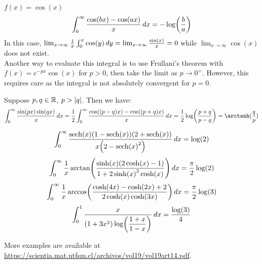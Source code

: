 \documentclass[main.tex]{subfiles}
\begin{document}
\begin{example}
    $f(x)=\cos(x)$
    \begin{equation*}
        \int_0^\infty \frac{\cos(bx)-\cos(ax)}{x}\,dx = -\log(\frac{b}{a})
    \end{equation*}
    In this case, $\lim_{x\to\infty} \frac{1}{x}\int_0^x \cos(y)\,dy=\lim_{x\to\infty} \frac{\sin(x)}{x}=0$ while $\lim_{x\to\infty} \cos(x)$ does not exist.\\
    
    Another way to evaluate this integral is to use Frullani's theorem with $f(x)=e^{-px}\cos(x)$ for $p>0$, then take the limit as $p\to0^+$. However, this requires care as the integral is not absolutely convergent for $p=0$.
\end{example}
\begin{example}
    Suppose $p,q\in\R$, $p>\abs{q}$. Then we have:
    \begin{equation*}
        \int_0^\infty \frac{\sin(px)\sin(qx)}{x}\dx
        = \frac{1}{2}\int_0^\infty \frac{\cos((p-q)x)-\cos((p+q)x)}{x}\dx
        = \frac{1}{2}\log(\frac{p+q}{p-q})
        = \arctanh(\frac{q}{p})
    \end{equation*}
\end{example}



\begin{equation*}
    \int_0^\infty \frac{\sech(x)(1-\sech(x))(2+\sech(x))}{x\qty(2-\sech(x)^2)}\dx=\log(2)
\end{equation*}
\vspace{10pt}
\begin{equation*}
    \int_0^\infty \frac{1}{x}\arctan(\frac{\sinh(x)\qty(2\cosh(x)-1)}{1+2\sinh(x)^2\cosh(x)})\,dx=\frac{\pi}{2}\log(2)
\end{equation*}
\vspace{10pt}
\begin{equation*}
    \int_0^\infty \frac{1}{x}\arccos(\frac{\cosh(4x)-\cosh(2x)+2}{2\cosh(x)\cosh(3x)})\,dx=\frac{\pi}{2}\log(3)
\end{equation*}
\vspace{10pt}
\begin{equation*}
    \int_0^1 \frac{x}{(1+3x^2)\log(\dfrac{1+x}{1-x})}\,dx=\frac{\log(3)}{4}
\end{equation*}

More examples are available at \url{https://scientia.mat.utfsm.cl/archivos/vol19/vol19art14.pdf}.
\end{document}
